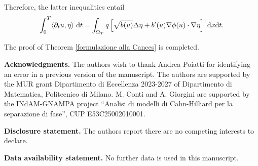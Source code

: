\documentclass[11pt,  reqno]{amsart}%
\theoremstyle{plain}
\theoremstyle{definition}
\theoremstyle{remark}
\numberwithin{equation}{section}
\newcommand{\dx}{\textup{d}x}
\newcommand{\dt}{\textup{d}t}
\begin{document}
Therefore, the latter inequalities entail 
\begin{equation}
\label{J Cances}
 \int_0^T \langle \partial_t u, \eta \rangle \  \dt 
= 
 \int_{\Omega_T} q \left[ \sqrt{b(u)} \Delta \eta +b'(u) \nabla \phi(u) \cdot \nabla\eta \right] \ \dx \dt.
\end{equation}

The proof of Theorem \ref{formulazione alla Cances} is completed. 

\bigskip

\noindent
\textbf{Acknowledgments.} 
The authors wish to thank Andrea Poiatti for identifying an error in a previous version of the manuscript.
The authors are supported by the MUR grant Dipartimento di Eccellenza 2023-2027 of Dipartimento di Matematica, Politecnico di Milano. 
M. Conti and A. Giorgini are supported by the INdAM-GNAMPA project ``Analisi di modelli di Cahn-Hilliard per la separazione di fase'', CUP E53C25002010001.

\bigskip

\noindent
\textbf{Disclosure statement.} The authors report there are no competing interests to declare.

\medskip

\noindent
\textbf{Data availability statement.} No further data is used in this manuscript.
\end{document}
